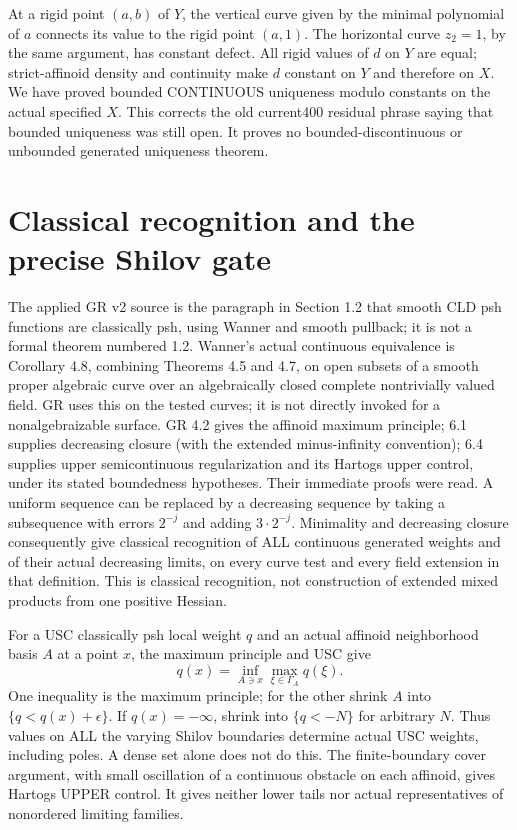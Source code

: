 At a rigid point $(a,b)$ of $Y$, the vertical curve given by the minimal
polynomial of $a$ connects its value to the rigid point $(a,1)$.
The horizontal curve $z_2=1$, by the same argument, has constant defect.
All rigid values of $d$ on $Y$ are equal; strict-affinoid density and continuity
make $d$ constant on $Y$ and therefore on $X$.
We have proved bounded CONTINUOUS uniqueness modulo constants on the actual
specified $X$. This corrects the old current400 residual phrase saying that
bounded uniqueness was still open. It proves no bounded-discontinuous or
unbounded generated uniqueness theorem.

\section{Classical recognition and the precise Shilov gate}
The applied GR v2 source is the paragraph in Section 1.2 that smooth CLD psh
functions are classically psh, using Wanner and smooth pullback; it is not a
formal theorem numbered 1.2. Wanner's actual continuous equivalence is
Corollary 4.8, combining Theorems 4.5 and 4.7, on open subsets of a smooth
proper algebraic curve over an algebraically closed complete nontrivially
valued field. GR uses this on the tested curves; it is not directly invoked
for a nonalgebraizable surface. GR 4.2 gives the affinoid maximum principle;
6.1 supplies decreasing closure (with the extended minus-infinity convention);
6.4 supplies upper semicontinuous regularization and its Hartogs upper control,
under its stated boundedness hypotheses. Their immediate proofs were read.
A uniform sequence can be replaced by a decreasing sequence by taking a
subsequence with errors $2^{-j}$ and adding $3\cdot2^{-j}$.
Minimality and decreasing closure consequently give classical recognition of
ALL continuous generated weights and of their actual decreasing limits,
on every curve test and every field extension in that definition.
This is classical recognition, not construction of extended mixed products
from one positive Hessian.

For a USC classically psh local weight $q$ and an actual affinoid neighborhood
basis $A$ at a point $x$, the maximum principle and USC give
\[
 q(x)=\inf_{A\ni x}\max_{\xi\in\Gamma_A}q(\xi).             \tag{12}
\]
One inequality is the maximum principle; for the other shrink $A$ into
$\{q<q(x)+\epsilon\}$. If $q(x)=-\infty$, shrink into $\{q<-N\}$ for
arbitrary $N$. Thus values on ALL the varying Shilov boundaries determine
actual USC weights, including poles. A dense set alone does not do this.
The finite-boundary cover argument, with small oscillation of a continuous
obstacle on each affinoid, gives Hartogs UPPER control. It gives neither
lower tails nor actual representatives of nonordered limiting families.
